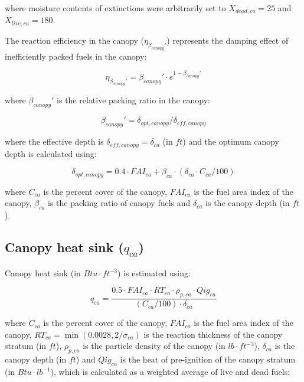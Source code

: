 \documentclass[]{book}
\begin{document}
where moisture contents of extinctions were arbitrarily set to
\(X_{dead, ca} = 25\) and \(X_{live, ca} = 180\).

The reaction efficiency in the canopy (\(\eta_{\beta_{canopy}'}\))
represents the damping effect of inefficiently packed fuels in the
canopy:

\begin{equation}
\eta_{\beta_{canopy}'} =\beta_{canopy}'\cdot e^{1- \beta_{canopy}'}
\end{equation}

where \(\beta_{canopy}'\) is the relative packing ratio in the canopy:

\begin{equation}
\beta_{canopy}' = \delta_{opt, canopy} / \delta_{eff, canopy}
\end{equation}

where the effective depth is \(\delta_{eff, canopy}=\delta_{ca}\) (in
\(ft\)) and the optimum canopy depth is calculated using:

\begin{equation}
\delta_{opt, canopy} = 0.4 \cdot FAI_{ca} + \beta_{ca} \cdot (\delta_{ca} \cdot C_{ca}/100)
\end{equation}

where \(C_{ca}\) is the percent cover of the canopy, \(FAI_{ca}\) is the
fuel area index of the canopy, \(\beta_{ca}\) is the packing ratio of
canopy fuels and \(\delta_{ca}\) is the canopy depth (in \(ft\)).

\subsection{\texorpdfstring{Canopy heat sink
(\(q_{ca}\))}{Canopy heat sink (q\_\{ca\})}}\label{canopy-heat-sink-q_ca}

Canopy heat sink (in \(Btu \cdot ft^{-3}\)) is estimated using:

\begin{equation}
q_{ca} = \frac{0.5 \cdot FAI_{ca} \cdot RT_{ca} \cdot \rho_{p, ca} \cdot Qig_{ca}}{(C_{ca}/100)\cdot \delta_{ca}}
\end{equation}

where \(C_{ca}\) is the percent cover of the canopy, \(FAI_{ca}\) is the
fuel area index of the canopy, \(RT_{ca} = \min(0.0028, 2/\sigma_{ca})\)
is the reaction thickness of the canopy stratum (in \(ft\)),
\(\rho_{p, ca}\) is the particle density of the canopy (in
\(lb \cdot ft^{-3}\)), \(\delta_{ca}\) is the canopy depth (in \(ft\))
and \(Qig_{ca}\) is the heat of pre-ignition of the canopy stratum (in
\(Btu \cdot lb^{-1}\)), which is calculated as a weighted average of
live and dead fuels:
\end{document}

